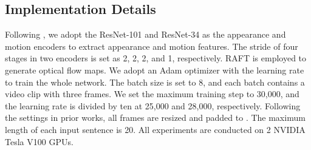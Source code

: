 \documentclass[10pt,twocolumn,letterpaper]{article}
\begin{document}
\vspace{-2mm}  
\subsection{Implementation Details}
\vspace{-2mm}
Following \cite{li2019motion}, we adopt the ResNet-101 and ResNet-34 \cite{he2016deep} as the appearance and motion encoders to extract appearance and motion features. The stride of four stages in two encoders is set as 2, 2, 2, and 1, respectively. RAFT \cite{teed2020raft} is employed to generate optical flow maps. We adopt an Adam \cite{kingma2014adam} optimizer with the learning rate  to train the whole network. The batch size is set to 8, and each batch contains a video clip with three frames. We set the maximum training step to 30,000, and the learning rate is divided by ten at 25,000 and 28,000, respectively. Following the settings in prior works, all frames are resized and padded to . The maximum length of each input sentence is 20. All experiments are conducted on 2 NVIDIA Tesla V100 GPUs. 
\end{document}
